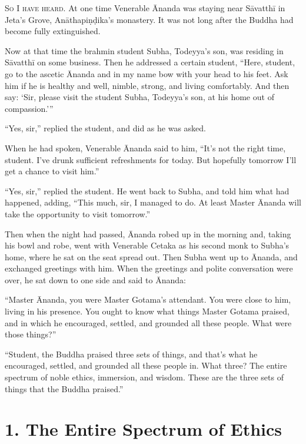 \documentclass[12pt,openany]{book}%
\newcommand*{\scevam}[1]{\textsc{#1}}
\begin{document}
\scevam{So I have heard. }At one time Venerable Ānanda was staying near \textsanskrit{Sāvatthī} in Jeta’s Grove, \textsanskrit{Anāthapiṇḍika}’s monastery. It was not long after the Buddha had become fully extinguished. 

Now at that time the brahmin student Subha, Todeyya’s son, was residing in \textsanskrit{Sāvatthī} on some business. Then he addressed a certain student, “Here, student, go to the ascetic Ānanda and in my name bow with your head to his feet. Ask him if he is healthy and well, nimble, strong, and living comfortably. And then say: ‘Sir, please visit the student Subha, Todeyya’s son, at his home out of compassion.’” 

“Yes, sir,” replied the student, and did as he was asked. 

When he had spoken, Venerable Ānanda said to him, “It’s not the right time, student. I’ve drunk sufficient refreshments for today. But hopefully tomorrow I’ll get a chance to visit him.” 

“Yes, sir,” replied the student. He went back to Subha, and told him what had happened, adding, “This much, sir, I managed to do. At least Master Ānanda will take the opportunity to visit tomorrow.” 

Then when the night had passed, Ānanda robed up in the morning and, taking his bowl and robe, went with Venerable Cetaka as his second monk to Subha’s home, where he sat on the seat spread out. Then Subha went up to Ānanda, and exchanged greetings with him. When the greetings and polite conversation were over, he sat down to one side and said to Ānanda: 

“Master Ānanda, you were Master Gotama’s attendant. You were close to him, living in his presence. You ought to know what things Master Gotama praised, and in which he encouraged, settled, and grounded all these people. What were those things?” 

“Student, the Buddha praised three sets of things, and that’s what he encouraged, settled, and grounded all these people in. What three? The entire spectrum of noble ethics, immersion, and wisdom. These are the three sets of things that the Buddha praised.” 

\section*{1. The Entire Spectrum of Ethics }
\end{document}
